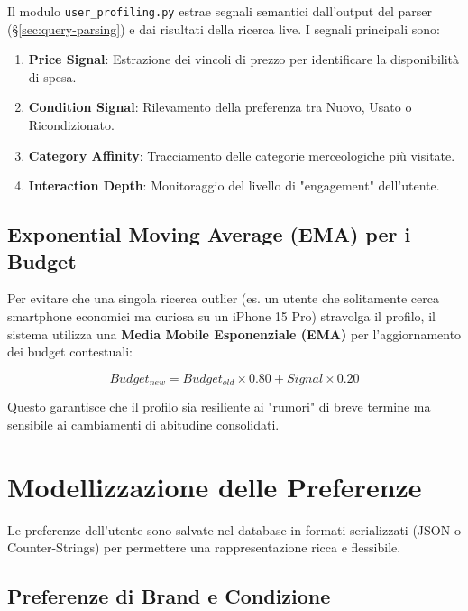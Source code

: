 Il modulo \texttt{user\_profiling.py} estrae segnali semantici dall'output del parser (\S\ref{sec:query-parsing}) e dai risultati della ricerca live. I segnali principali sono:

\begin{enumerate}
    \item \textbf{Price Signal}: Estrazione dei vincoli di prezzo per identificare la disponibilità di spesa.
    \item \textbf{Condition Signal}: Rilevamento della preferenza tra Nuovo, Usato o Ricondizionato.
    \item \textbf{Category Affinity}: Tracciamento delle categorie merceologiche più visitate.
    \item \textbf{Interaction Depth}: Monitoraggio del livello di "engagement" dell'utente.
\end{enumerate}

\subsection{Exponential Moving Average (EMA) per i Budget}
\label{subsec:profiling-ema}

Per evitare che una singola ricerca outlier (es. un utente che solitamente cerca smartphone economici ma curiosa su un iPhone 15 Pro) stravolga il profilo, il sistema utilizza una \textbf{Media Mobile Esponenziale (EMA)} per l'aggiornamento dei budget contestuali:

\begin{equation}
    Budget_{new} = Budget_{old} \times 0.80 + Signal \times 0.20
\end{equation}

Questo garantisce che il profilo sia resiliente ai "rumori" di breve termine ma sensibile ai cambiamenti di abitudine consolidati.

\section{Modellizzazione delle Preferenze}
\label{sec:profiling-models}

Le preferenze dell'utente sono salvate nel database in formati serializzati (JSON o Counter-Strings) per permettere una rappresentazione ricca e flessibile.

\subsection{Preferenze di Brand e Condizione}
\label{subsec:profiling-brands}

